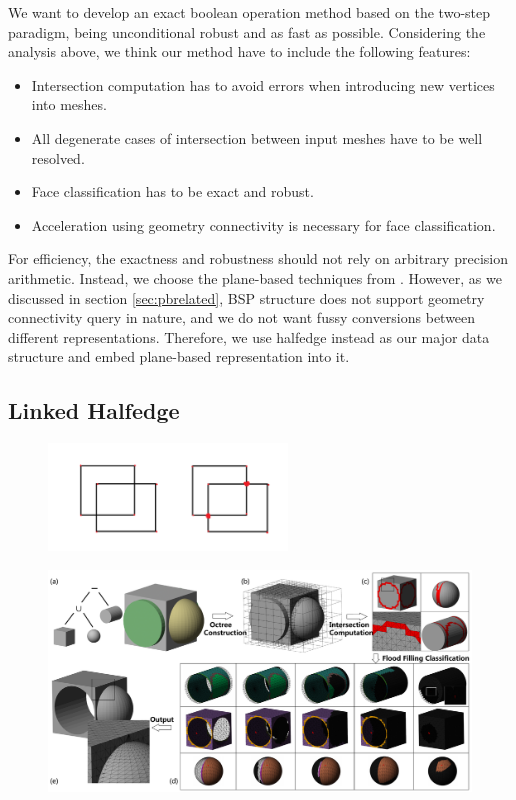 \documentclass[10pt,journal,compsoc]{IEEEtran}
\begin{document}
We want to develop an exact boolean operation method based on the two-step paradigm, being unconditional robust and as fast as possible. Considering the analysis above, we think our method have to include the following features:
\begin{itemize}
    \item Intersection computation has to avoid errors when introducing new vertices into meshes.
    \item All degenerate cases of intersection between input meshes have to be well resolved.
    \item Face classification has to be exact and robust.
    \item Acceleration using geometry connectivity is necessary for face classification.
\end{itemize}

For efficiency, the exactness and robustness should not rely on arbitrary precision arithmetic. Instead, we choose the plane-based techniques from \cite{campen2010exact}. However, as we discussed in section \ref{sec:pbrelated}, BSP structure does not support geometry connectivity query in nature, and we do not want fussy conversions between different representations. Therefore, we use halfedge instead as our major data structure and embed plane-based representation into it.

\subsection{Linked Halfedge}

\begin{figure}[t]
\centering
\includegraphics[width=2.5in]{linkedhalfedge}
\caption{{\color{red}{Sketch: The Linked Halfedge structure}}}
\label{fig:linkedhalfedge}
\end{figure}


\begin{figure}[!t]
\centering
\includegraphics[width=7.1in]{flowchart}
\caption{{\color{red}{Sketch: overview, will be replaced}}}
\label{fig:overview}
\end{figure}
\end{document}
